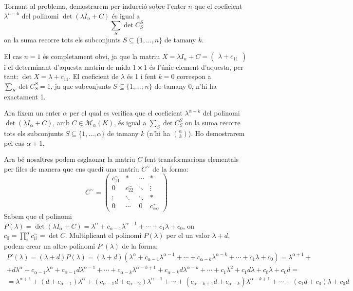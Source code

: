 \documentclass[11pt,a4paper]{article}
\begin{document}
\begin{enumerate}
    Tornant al problema, demostrarem per inducció sobre l'enter $n$ que el coeficient $\lambda^{n-k}$ del polinomi $\det (\lambda I_n+C)$ és igual a $$\sum_S\det C_S^S$$ on la suma recorre tots els subconjunts $S\subseteq \{1,\ldots,n\}$ de tamany $k$.\par
    El cas $n=1$ és completament obvi, ja que la matriu $X=\lambda I_n+C=\begin{pmatrix}
   \lambda +c_{11}
   \end{pmatrix}$ i el determinant d'aquesta matriu de mida $1\times1$ és l'únic element d'aquesta, per tant: $\det X=\lambda +c_{11}$. El coeficient de $\lambda$ és 1 i fent $k=0$ correspon a $\sum_S\det C_S^S=1$, ja que subconjunts $S\subseteq \{1,\ldots,n\}$ de tamany 0, n'hi ha exactament 1.\par
   Ara fixem un enter $\alpha$ per el qual es verifica que el coeficient $\lambda^{\alpha-k}$ del polinomi $\det (\lambda I_\alpha+C)$, amb $C\in \mathcal{M}_\alpha(K)$, és igual a $\sum_S\det C_S^S$ on la suma recorre tots els subconjunts $S\subseteq \{1,\ldots,\alpha\}$ de tamany $k$ (n'hi ha $\binom{\alpha}{k}$). Ho demostrarem pel cas $\alpha+1$.\par Ara bé nosaltres podem esglaonar la matriu $C$ fent transformacions elementals per files de manera que ens quedi una matriu $C^\sim$ de la forma: $$C^\sim=\begin{pmatrix}
      c_{11}^\sim & \ast & \cdots & \ast \\
      0 & c_{22}^\sim & \ddots & \vdots \\
      \vdots & \ddots & \ddots & \ast \\
      0 & \cdots & 0 & c_{\alpha\alpha}^\sim
   \end{pmatrix}$$
   Sabem que el polinomi $P(\lambda)=\det(\lambda I_\alpha+C)=\lambda^\alpha+c_{\alpha-1}\lambda^{\alpha-1}+\cdots+c_1\lambda+c_0$, on $c_0=\prod_i^\alpha c_{ii}^\sim=\det C$. 
   Multiplicant el polinomi $P(\lambda)$ per el un valor $\lambda +d$, podem crear un altre polinomi $P'(\lambda)$ de la forma: 
   \begin{multline*}
       P'(\lambda)=(\lambda+d)P(\lambda)=(\lambda+d)(\lambda^\alpha+c_{\alpha-1}\lambda^{\alpha-1}+\cdots+c_{\alpha-k}\lambda^{\alpha-k}+\cdots+c_1\lambda+c_0)=\lambda^{\alpha+1}+\\+d\lambda^\alpha+c_{\alpha-1}\lambda^\alpha+c_{\alpha-1}d\lambda^{\alpha-1}+\cdots+c_{\alpha-k}\lambda^{\alpha-k+1}+c_{\alpha-k}d\lambda^{\alpha-k}+\cdots+c_1\lambda^2+c_1d\lambda+c_0\lambda+c_0d=\\=\lambda^{\alpha+1}+(d+c_{\alpha-1})\lambda^\alpha+(c_{\alpha-1}d+c_{\alpha-2})\lambda^{\alpha-1}+\cdots+(c_{\alpha-k+1}d+c_{\alpha-k})\lambda^{\alpha-k+1}+\cdots+(c_1d+c_0)\lambda+c_0d

\end{multline*}
\end{enumerate}
\end{document}
